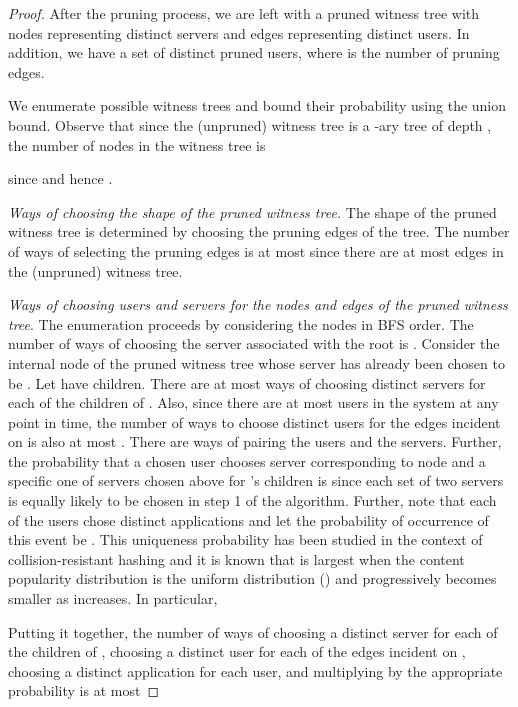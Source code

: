 \documentclass[conference]{IEEEtran}
\begin{document}
\begin{proof}
After the pruning process, we are left with a pruned witness tree with nodes representing distinct servers and edges representing distinct users. In addition, we have a set  of  distinct pruned users, where  is the number of pruning edges. 

We enumerate possible witness trees and bound their probability using the union bound. Observe that since the (unpruned) witness tree is a -ary tree of depth , the number of nodes in the witness tree is 

since  and hence .

{\em Ways of choosing the shape of the pruned witness tree.}
The shape of the pruned witness tree is determined by choosing the  pruning edges of the tree. The number of ways of selecting the  pruning edges is at most  since there are at most  edges in the (unpruned) witness tree. 

{\em Ways of choosing users and
servers for the nodes and edges of the pruned witness tree}. The enumeration
proceeds by considering the nodes in BFS order.  The number of ways of
choosing the server associated with the root is . Consider the  internal node  of the pruned witness tree
whose server has already been chosen to be . Let  have 
children. There are at most  ways of
choosing distinct servers for each of the  children of
.  Also, since there are at most  users in the system
at any point in time, the number of ways to choose 
distinct users for the
 edges incident on  is also at most
. There are 
ways of pairing the users and the servers.
Further, the probability that a chosen user
chooses server  corresponding to node  and a specific one of
 servers chosen above for 's children is  since each set of two servers is equally likely to be chosen in step 1 of the algorithm. Further, note that each of the  users chose  distinct applications and let the probability of occurrence of this event be . This uniqueness probability has been studied in the context of collision-resistant hashing and it is known \cite{bellare2004hash} that
 is largest when the content popularity distribution is the uniform distribution () and progressively becomes smaller as  increases. In particular, 

Putting it together, the number of ways of choosing a distinct
server for each of the  children of , choosing a distinct
user for each of the  edges incident on , choosing a distinct application for each user, and  multiplying by the appropriate probability is at most 
 

\end{proof}
\end{document}
